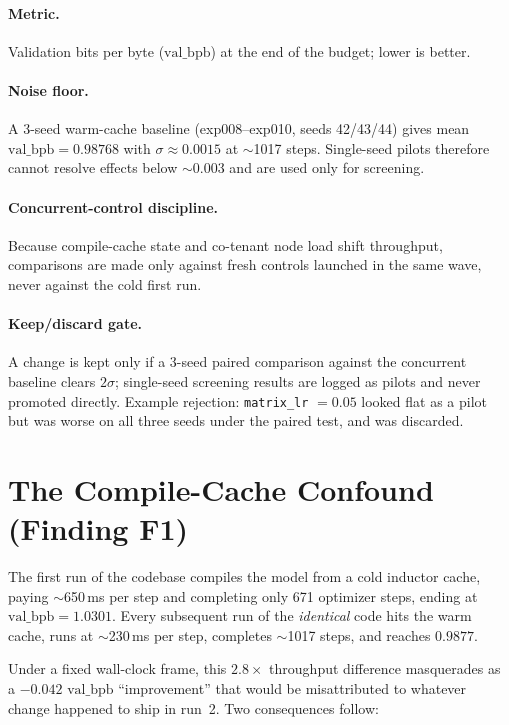 \documentclass{article}
\newcommand{\valbpb}{\mathrm{val\_bpb}}
\begin{document}
\paragraph{Metric.} Validation bits per byte ($\valbpb$) at the end of the budget; lower is better.

\paragraph{Noise floor.} A 3-seed warm-cache baseline (exp008--exp010, seeds 42/43/44) gives mean $\valbpb = 0.98768$ with $\sigma \approx 0.0015$ at $\sim$1017 steps. Single-seed pilots therefore cannot resolve effects below $\sim$0.003 and are used only for screening.

\paragraph{Concurrent-control discipline.} Because compile-cache state and co-tenant node load shift throughput, comparisons are made only against fresh controls launched in the same wave, never against the cold first run.

\paragraph{Keep/discard gate.} A change is kept only if a 3-seed paired comparison against the concurrent baseline clears $2\sigma$; single-seed screening results are logged as pilots and never promoted directly. Example rejection: \texttt{matrix\_lr} $= 0.05$ looked flat as a pilot but was worse on all three seeds under the paired test, and was discarded.

\section{The Compile-Cache Confound (Finding F1)}
\label{sec:confound}

The first run of the codebase compiles the model from a cold inductor cache, paying $\sim$650\,ms per step and completing only 671 optimizer steps, ending at $\valbpb = 1.0301$. Every subsequent run of the \emph{identical} code hits the warm cache, runs at $\sim$230\,ms per step, completes $\sim$1017 steps, and reaches $0.9877$.

Under a fixed wall-clock frame, this $2.8\times$ throughput difference masquerades as a $-0.042$ $\valbpb$ ``improvement'' that would be misattributed to whatever change happened to ship in run~2. Two consequences follow:
\end{document}
